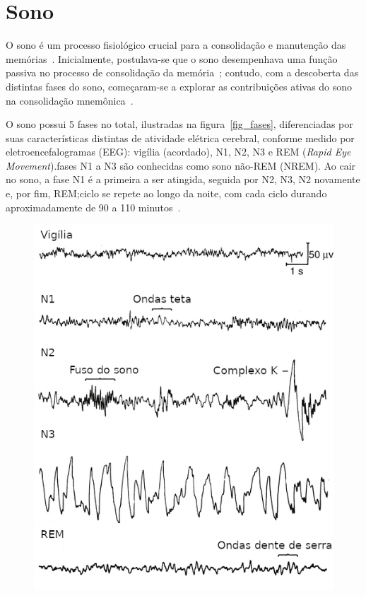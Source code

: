 \section{Sono}

O sono é um processo fisiológico crucial para a consolidação e manutenção das memórias~\cite{blissittSleep2001, walkerSleep2006,
diekelmannMemory2010}. Inicialmente, postulava-se que o sono desempenhava uma função passiva no processo de consolidação da
memória~\cite{jenkinsObliviscence1924}; contudo, com a descoberta das distintas fases do sono, começaram-se a explorar as
contribuições ativas do sono na consolidação mnemônica~\cite{aserinskyRegularly1953}.

O sono possui 5 fases no total, ilustradas na figura~\ref{fig_fases}, diferenciadas por suas características distintas de
atividade elétrica cerebral, conforme medido por eletroencefalogramas (EEG)\cite{silberVisual2007}: vigília (acordado), N1, N2, N3
e REM (\textit{Rapid Eye Movement}).\@As fases N1 a N3 são conhecidas como sono não-REM (NREM). Ao cair no sono, a fase N1 é a
primeira a ser atingida, seguida por N2, N3, N2 novamente e, por fim, REM;\@esse ciclo se repete ao longo da noite, com cada ciclo
durando aproximadamente de 90 a 110 minutos~\cite{k.patelPhysiology2022}.

\begin{figure}[!ht]
\centering
\includegraphics[width=12cm]{figuras/fases_sono.png}
\end{figure}

